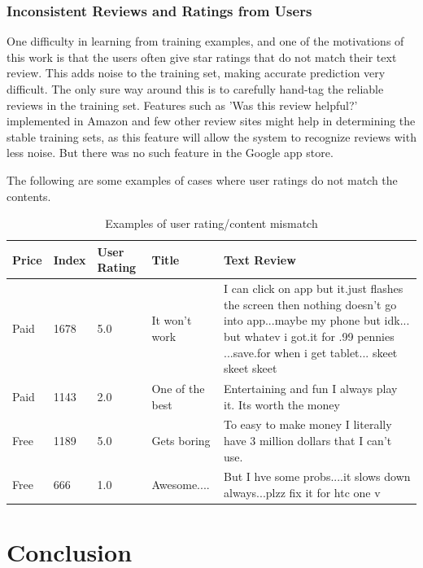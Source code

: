 \documentclass[11pt]{report} %
\begin{document}
\subsection{Inconsistent Reviews and Ratings from Users}

One difficulty in learning from training examples, and one of the motivations of this work is that the users often give star ratings that do not match their text review. This adds noise to the training set, making accurate prediction very difficult. The only sure way around this is to carefully hand-tag the reliable reviews in the training set. Features such as 'Was this review helpful?' implemented in Amazon and few other review sites might help in determining the stable training sets, as this feature will allow the system to recognize reviews with less noise. But there was no such feature in the Google app store.

The following are some examples of cases where user ratings do not match the contents.

\begin{table}[h]
	\centering
    \begin{tabularx}{\textwidth}{ l | l | l |  l | X}
    \hline\hline
		Price  & Index & User Rating & Title & Text Review\\ 
    \hline
    \hline
		Paid & 1678 & 5.0 & It won't work & I can click on app but it.just flashes the screen then nothing doesn't go into app...maybe my phone but idk... but whatev i got.it for .99 pennies ...save.for when i get tablet... skeet skeet skeet \\
    \hline
		Paid & 1143 & 2.0 & One of the best & Entertaining and fun I always play it. Its worth the money \\
    \hline
		Free & 1189 & 5.0 & Gets boring & To easy to make money I literally have 3 million dollars that I can't use. \\
    \hline
		Free & 666 & 1.0 & Awesome.... & But I hve some probs....it slows down always...plzz fix it for htc one v \\
    \hline
    \end{tabularx}
\caption{Examples of user rating/content mismatch}
\label{fig:postags}
\end{table}

\chapter{Conclusion}
\end{document}
